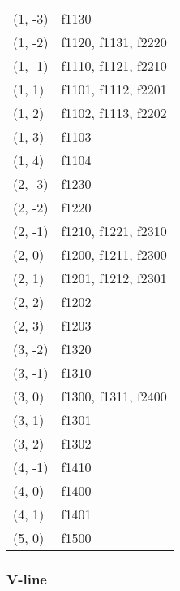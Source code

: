 \documentclass[12pt,a4,]{article}
\numberwithin{equation}{subsection}
\begin{document}
\begin{longtable}[]{@{}ll@{}}
(1, -3) & f1130 \\
(1, -2) & f1120, f1131, f2220 \\
(1, -1) & f1110, f1121, f2210 \\
(1, 1) & f1101, f1112, f2201 \\
(1, 2) & f1102, f1113, f2202 \\
(1, 3) & f1103 \\
(1, 4) & f1104 \\
(2, -3) & f1230 \\
(2, -2) & f1220 \\
(2, -1) & f1210, f1221, f2310 \\
(2, 0) & f1200, f1211, f2300 \\
(2, 1) & f1201, f1212, f2301 \\
(2, 2) & f1202 \\
(2, 3) & f1203 \\
(3, -2) & f1320 \\
(3, -1) & f1310 \\
(3, 0) & f1300, f1311, f2400 \\
(3, 1) & f1301 \\
(3, 2) & f1302 \\
(4, -1) & f1410 \\
(4, 0) & f1400 \\
(4, 1) & f1401 \\
(5, 0) & f1500 \\
\bottomrule()
\end{longtable}

\hypertarget{v-line}{%
\subsubsection{V-line}\label{v-line}}
\end{document}
